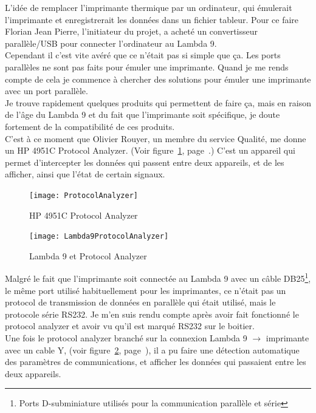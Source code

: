 \documentclass[12pt]{article}
\begin{document}
L'idée de remplacer l'imprimante thermique par un ordinateur, qui émulerait l'imprimante et enregistrerait les données dans un fichier tableur.
Pour ce faire Florian Jean Pierre, l'initiateur du projet, a acheté un convertisseur parallèle/USB pour connecter l'ordinateur au Lambda 9.\\
Cependant il c'est vite avéré que ce n'était pas si simple que ça.
Les ports parallèles ne sont pas faits pour émuler une imprimante.
Quand je me rends compte de cela je commence à chercher des solutions pour émuler une imprimante avec un port parallèle.\\
Je trouve rapidement quelques produits qui permettent de faire ça, mais en raison de l'âge du Lambda 9 et du fait que l'imprimante soit spécifique, je doute fortement de la compatibilité de ces produits.\\
C'est à ce moment que Olivier Rouyer, un membre du service Qualité, me donne un HP 4951C Protocol Analyzer.
(Voir figure~\ref{fig:protocolAnalyzer}, page~\pageref{fig:protocolAnalyzer}.)
C'est un appareil qui permet d'intercepter les données qui passent entre deux appareils, et de les afficher, ainsi que l'état de certain signaux.\\
\begin{figure}[H]
	\centering
	\texttt{[image: ProtocolAnalyzer]}
	\caption{HP 4951C Protocol Analyzer}
	\label{fig:protocolAnalyzer}
\end{figure}
\begin{figure}[H]
	\centering
	\texttt{[image: Lambda9ProtocolAnalyzer]}
	\caption{Lambda 9 et Protocol Analyzer}
	\label{fig:lambda9HP}
\end{figure}
Malgré le fait que l'imprimante soit connectée au Lambda 9 avec un câble DB25\footnote{Ports D-subminiature utilisés pour la communication parallèle et série}, le même port utilisé habituellement pour les imprimantes, ce n'était pas un protocol de transmission de données en parallèle qui était utilisé, mais le protocole série RS232.
Je m'en suis rendu compte après avoir fait fonctionné le protocol analyzer et avoir vu qu'il est marqué RS232 sur le boitier.\\
Une fois le protocol analyzer branché sur la connexion Lambda 9 $\rightarrow$ imprimante avec un cable Y, (voir figure~\ref{fig:lambda9HP}, page~\pageref{fig:lambda9HP}), il a pu faire une détection automatique des paramètres de communications, et afficher les données qui passaient entre les deux appareils.
\end{document}
